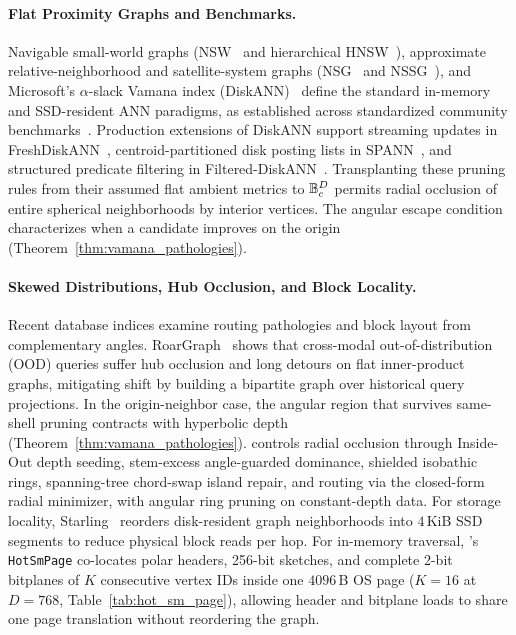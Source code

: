 \paragraph{Flat Proximity Graphs and Benchmarks.}
Navigable small-world graphs ({NSW}~\cite{malkov2014approximate} and hierarchical {HNSW}~\cite{malkov2020hnsw}), approximate relative-neighborhood and satellite-system graphs ({NSG}~\cite{fu2019nsg} and {NSSG}~\cite{fu2022high}), and Microsoft's $\alpha$-slack {Vamana} index ({DiskANN})~\cite{subramanya2019diskann} define the standard in-memory and SSD-resident {ANN} paradigms, as established across standardized community benchmarks~\cite{aumuller2020annbenchmarks,wang2021comprehensive,simhadri2022results,azizi2025graph}.
Production extensions of {DiskANN} support streaming updates in {FreshDiskANN}~\cite{singh2021freshdiskann}, centroid-partitioned disk posting lists in {SPANN}~\cite{chen2021spann}, and structured predicate filtering in {Filtered-DiskANN}~\cite{gollapudi2023filtered}.
Transplanting these pruning rules from their assumed flat ambient metrics to $\mathbb{B}_c^D$ permits radial occlusion of entire spherical neighborhoods by interior vertices. The angular escape condition characterizes when a candidate improves on the origin (Theorem~\ref{thm:vamana_pathologies}).

\paragraph{Skewed Distributions, Hub Occlusion, and Block Locality.}
Recent database indices examine routing pathologies and block layout from complementary angles.
{RoarGraph}~\cite{chen2024roargraph} shows that cross-modal out-of-distribution ({OOD}) queries suffer hub occlusion and long detours on flat inner-product graphs, mitigating shift by building a bipartite graph over historical query projections.
In the origin-neighbor case, the angular region that survives same-shell pruning contracts with hyperbolic depth (Theorem~\ref{thm:vamana_pathologies}).
\rquiver{} controls radial occlusion through Inside-Out depth seeding, stem-excess angle-guarded dominance, shielded isobathic rings, spanning-tree chord-swap island repair, and routing via the closed-form radial minimizer, with angular ring pruning on constant-depth data.
For storage locality, {Starling}~\cite{wang2024starling} reorders disk-resident graph neighborhoods into $4$\,KiB SSD segments to reduce physical block reads per hop.
For in-memory traversal, \rquiver{}'s \texttt{HotSmPage} co-locates polar headers, 256-bit sketches, and complete 2-bit bitplanes of $K$ consecutive vertex IDs inside one $4096$\,B OS page ($K=16$ at $D=768$, Table~\ref{tab:hot_sm_page}), allowing header and bitplane loads to share one page translation without reordering the graph.

